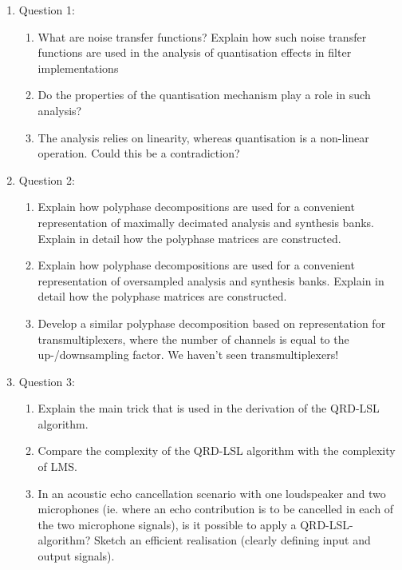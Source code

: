 \documentclass[
  a4paper,
  ,captions=tableheading
]{scrartcl}
\providecommand{\tightlist}{%
  \setlength{\itemsep}{0pt}\setlength{\parskip}{0pt}}
\begin{document}
\begin{enumerate}
\def\labelenumi{\arabic{enumi}.}
\tightlist
\item
  Question 1:

  \begin{enumerate}
  \def\labelenumii{\arabic{enumii}.}
  \tightlist
  \item
    What are noise transfer functions? Explain how such noise transfer
    functions are used in the analysis of quantisation effects in filter
    implementations\\
  \item
    Do the properties of the quantisation mechanism play a role in such
    analysis?\\
  \item
    The analysis relies on linearity, whereas quantisation is a
    non-linear operation. Could this be a contradiction?\\
  \end{enumerate}
\item
  Question 2:

  \begin{enumerate}
  \def\labelenumii{\arabic{enumii}.}
  \tightlist
  \item
    Explain how polyphase decompositions are used for a convenient
    representation of maximally decimated analysis and synthesis banks.
    Explain in detail how the polyphase matrices are constructed.\\
  \item
    Explain how polyphase decompositions are used for a convenient
    representation of oversampled analysis and synthesis banks. Explain
    in detail how the polyphase matrices are constructed.\\
  \item
    Develop a similar polyphase decomposition based on representation
    for transmultiplexers, where the number of channels is equal to the
    up-/downsampling factor. We haven't seen transmultiplexers!\\
  \end{enumerate}
\item
  Question 3:

  \begin{enumerate}
  \def\labelenumii{\arabic{enumii}.}
  \tightlist
  \item
    Explain the main trick that is used in the derivation of the QRD-LSL
    algorithm.\\
  \item
    Compare the complexity of the QRD-LSL algorithm with the complexity
    of LMS.\\
  \item
    In an acoustic echo cancellation scenario with one loudspeaker and
    two microphones (ie. where an echo contribution is to be cancelled
    in each of the two microphone signals), is it possible to apply a
    QRD-LSL-algorithm? Sketch an efficient realisation (clearly defining
    input and output signals).
  \end{enumerate}
\end{enumerate}
\end{document}
